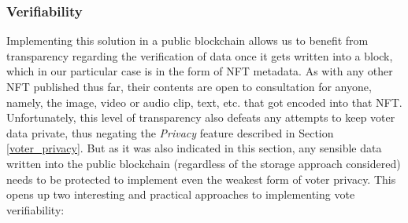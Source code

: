 \documentclass[../main.tex]{subfiles}
\begin{document}
        \subsubsection{Verifiability}
            \label{verifiability}
            Implementing this solution in a public blockchain allows us to benefit from transparency regarding the verification of data once it gets written into a block, which in our particular case is in the form of NFT metadata. As with any other NFT published thus far, their contents are open to consultation for anyone, namely, the image, video or audio clip, text, etc. that got encoded into that NFT. Unfortunately, this level of transparency also defeats any attempts to keep voter data private, thus negating the \textit{Privacy} feature described in Section \ref{voter_privacy}. But as it was also indicated in this section, any sensible data written into the public blockchain (regardless of the storage approach considered) needs to be protected to implement even the weakest form of voter privacy. This opens up two interesting and practical approaches to implementing vote verifiability:
\end{document}
